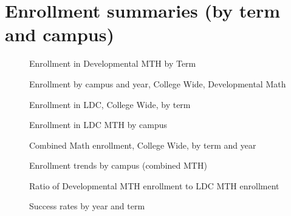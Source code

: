 \chapter{Enrollment summaries (by term and campus)}\label{sec:app:enrollment}

\begin{figure}[!htb]
	\centering
	
	\caption{Enrollment in Developmental MTH by Term}
\end{figure}
\begin{figure}[!htb]
	\centering
	
	\caption{Enrollment by campus and year, College Wide, Developmental Math}
    \label{app:fig:enrollmentDevelopCampus}
\end{figure}
\begin{figure}[!htb]
	\centering
	
	\caption{Enrollment in LDC, College Wide, by term}
\end{figure}
\begin{figure}[!htb]
	\centering
	
	\caption{Enrollment in LDC MTH by campus}
    \label{app:fig:enrollmentLDCCampus}
\end{figure}
\begin{figure}[!htb]
	\centering
	
	\caption{Combined Math enrollment, College Wide, by term and year}
\end{figure}
\begin{figure}[!htb]
	\centering
	
	\caption{Enrollment trends by campus (combined MTH)}
\end{figure}
\begin{figure}[!htb]
	\centering
	
	\caption{Ratio of Developmental MTH enrollment to LDC MTH enrollment}
\end{figure}
\begin{figure}[!htb]
	\centering
	
	\caption{Success rates by year and term}
\end{figure}

